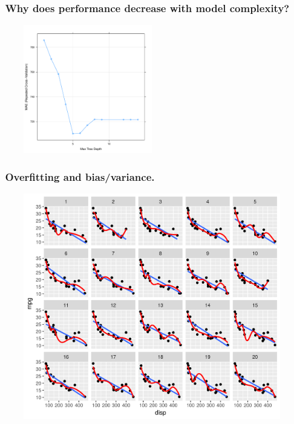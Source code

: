 \documentclass[handout, aspectratio = 169]{beamer}
\begin{document}
\begin{frame}
\frametitle{\insertframenumber~Why does performance decrease  with model complexity?}
\vspace{-4mm}
\begin{figure}
    \includegraphics[width = 0.5\textwidth]{rpart_perf.pdf}
\end{figure} 

\end{frame} 


\begin{frame}
\frametitle{\insertframenumber~Overfitting and bias/variance.}

\begin{figure}
    \includegraphics[height = 0.8\textheight]{bias-variance.png}
\end{figure} 

\end{frame} 
\end{document}
